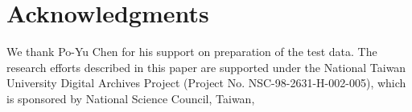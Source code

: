 

\section{Acknowledgments}

We thank Po-Yu Chen for his support on preparation of the test data.  The
research efforts described in this paper are supported under the National Taiwan
University Digital Archives Project (Project No.  NSC-98-2631-H-002-005), which
is sponsored by National Science Council, Taiwan, 
